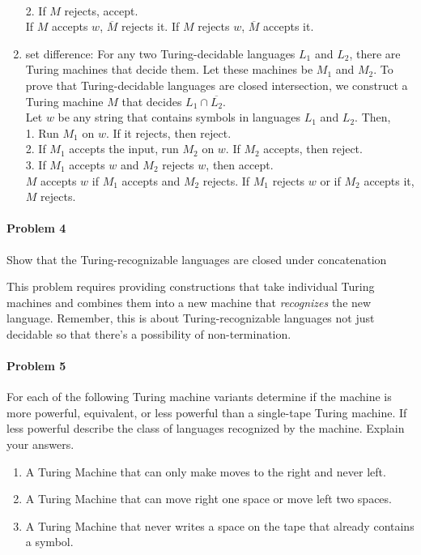 \documentclass{article}
\begin{document}
\begin{enumerate}[\indent a)]
    \\2. If $M$ rejects, accept.
    \\If $M$ accepts $w$, $\overline{M}$ rejects it. If $M$ rejects $w$, $\overline{M}$ accepts it.
    \item set difference: For any two Turing-decidable languages $L_1$ and $L_2$, there are Turing machines that decide them. Let these machines be $M_1$ and $M_2$. To prove that Turing-decidable languages are closed intersection, we construct a Turing machine $M$ that decides $L_1 \cap \overline{L_2}$.
    \\Let $w$ be any string that contains symbols in languages $L_1$ and $L_2$. Then,
    \\1. Run $M_1$ on $w$. If it rejects, then reject.
    \\2. If $M_1$ accepts the input, run $M_2$ on $w$. If $M_2$ accepts, then reject.
    \\3. If $M_1$ accepts $w$ and $M_2$ rejects $w$, then accept.
    \\$M$ accepts $w$ if $M_1$ accepts and $M_2$ rejects. If $M_1$ rejects $w$ or if $M_2$ accepts it, $M$ rejects.
\end{enumerate} 

\paragraph{Problem 4}
Show that the Turing-recognizable languages are closed under concatenation

This problem requires providing constructions that take individual Turing machines and combines 
them into a new machine that {\em recognizes} the new language. Remember, this is about 
Turing-recognizable languages not just decidable so that there's a possibility of non-termination.

\paragraph{Problem 5} For each of the following Turing machine variants determine if the machine
is more powerful, equivalent, or less powerful than a single-tape Turing machine. If less powerful
describe the class of languages recognized by the machine. Explain your answers.
\begin{enumerate}[\indent a)]
    \item A Turing Machine that can only make moves to the right and never left.
    \item A Turing Machine that can move right one space or move left two spaces.
    \item A Turing Machine that never writes a space on the tape that already contains a symbol.
\end{enumerate}
\end{document}
